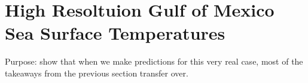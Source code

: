 \section{High Resoltuion Gulf of Mexico Sea Surface Temperatures}
\label{sec:gom}

Purpose: show that when we make predictions for this very real case, most of the
takeaways from the previous section transfer over.
